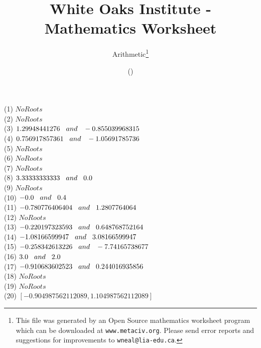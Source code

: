 \documentclass[letter]{article}
\begin{document}
\title{White Oaks Institute - Mathematics Worksheet}
\author{Arithmetic\thanks{This file was generated by an \textsf{Open Source} mathematics worksheet program which can be downloaded at \texttt{www.metaciv.org}. Please send error reports and suggestions for improvements to \texttt{wneal@lia-edu.ca}.}}
\date{\XCfileversion{} (\XCfiledate)}
\maketitle
\begin{multicols}{2}(1) $No Roots$\\(2) $No Roots$\\(3) $1.29948441276\hspace{3 mm} and \hspace{3 mm} -0.855039968315$\\(4) $0.756917857361\hspace{3 mm} and \hspace{3 mm} -1.05691785736$\\(5) $No Roots$\\(6) $No Roots$\\(7) $No Roots$\\(8) $3.33333333333\hspace{3 mm} and \hspace{3 mm} 0.0$\\(9) $No Roots$\\(10) $-0.0\hspace{3 mm} and \hspace{3 mm} 0.4$\\(11) $-0.780776406404\hspace{3 mm} and \hspace{3 mm} 1.2807764064$\\(12) $No Roots$\\(13) $-0.220197323593\hspace{3 mm} and \hspace{3 mm} 0.648768752164$\\(14) $-1.08166599947\hspace{3 mm} and \hspace{3 mm} 3.08166599947$\\(15) $-0.258342613226\hspace{3 mm} and \hspace{3 mm} -7.74165738677$\\(16) $3.0\hspace{3 mm} and \hspace{3 mm} 2.0$\\(17) $-0.910683602523\hspace{3 mm} and \hspace{3 mm} 0.244016935856$\\(18) $No Roots$\\(19) $No Roots$\\(20) $[-0.904987562112089, 1.104987562112089]$\end{multicols}
\end{document}
